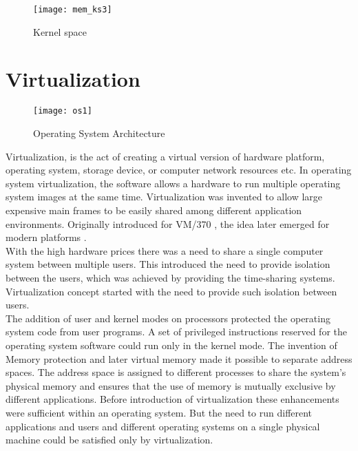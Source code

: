 \begin{figure}[!ht]
\centering
\texttt{[image: mem\_ks3]}
\caption{Kernel space}
\label{fig:Kernel space3}
\end{figure}


\clearpage
\section{Virtualization}

\begin{figure}[!ht]
\centering
\texttt{[image: os1]}
\caption{Operating System Architecture}
\label{fig:OS}
\end{figure}

Virtualization, is the act of creating a virtual version of hardware platform, operating system, storage device, or computer network resources etc. In operating system virtualization, the software allows a hardware to run multiple operating system images at the same time. Virtualization was invented to allow large expensive main frames to be easily shared among different application environments.\cite{Menascé05virtualization:concepts} Originally introduced for VM/370 \cite{Creasy:1981:OVT:1664853.1664863}, the idea later emerged for modern platforms \cite{Bugnion:1997:DRC:265924.265930, Rosenblum:2004:RVM:1016998.1017000}. 
\\
With the high hardware prices there was a need to share a single computer system between multiple users. This introduced the need to provide isolation between the users, which was achieved by providing the time-sharing systems. Virtualization concept started with the need to provide such isolation between users. 
\\
The addition of user and kernel modes on processors protected the operating system code from user programs. A set of privileged instructions reserved for the operating system software could run only in the kernel mode. The invention of Memory protection and later virtual memory made it possible to separate address spaces. The address space is assigned to different processes to share the system's physical memory and ensures that the use of memory is mutually exclusive by different applications. Before introduction of virtualization these enhancements were sufficient within an operating system. But the need to run different applications and users and different operating systems on a single physical machine could be satisfied only by virtualization.\cite{Crosby:2006:VR:1189276.1189289}
\\
